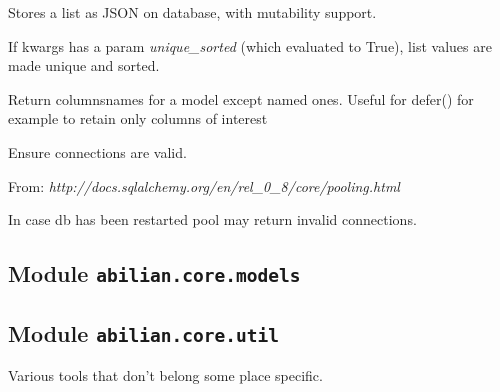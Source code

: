 \documentclass[a4paper,12pt,english]{sphinxmanual}
\begin{document}

\begin{fulllineitems}
\label{api:abilian.core.sqlalchemy.JSONList}
Stores a list as JSON on database, with mutability support.

If kwargs has a param \emph{unique\_sorted} (which evaluated to True), list values
are made unique and sorted.

\end{fulllineitems}


\begin{fulllineitems}
\label{api:abilian.core.sqlalchemy.filter_cols}
Return columnsnames for a model except named ones. Useful for defer()
for example to retain only columns of interest

\end{fulllineitems}


\begin{fulllineitems}
\label{api:abilian.core.sqlalchemy.ping_connection}
Ensure connections are valid.

From: \emph{http://docs.sqlalchemy.org/en/rel\_0\_8/core/pooling.html}

In case db has been restarted pool may return invalid connections.

\end{fulllineitems}



\subsection{Module \texttt{abilian.core.models}}
\label{api:module-abilian-core-models}

\subsection{Module \texttt{abilian.core.util}}
\label{api:module-abilian-core-util}\label{api:module-abilian.core.util}
Various tools that don't belong some place specific.
\end{document}
